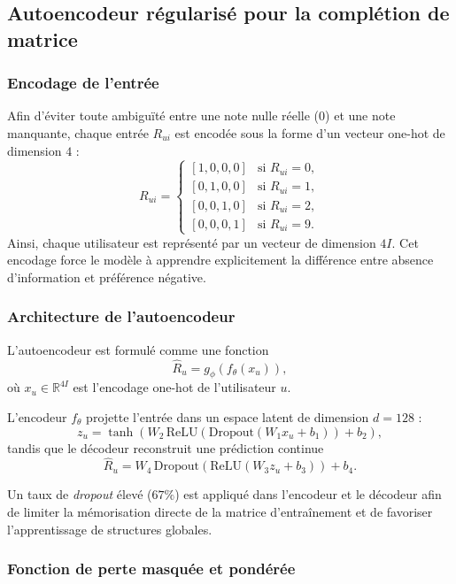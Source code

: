 \documentclass[11pt,a4paper]{article}
\begin{document}
\subsection{Autoencodeur régularisé pour la complétion de matrice}


\subsubsection{Encodage de l’entrée}

Afin d’éviter toute ambiguïté entre une note nulle réelle ($0$) et une note manquante, chaque entrée $R_{ui}$ est encodée sous la forme d’un vecteur one-hot de dimension $4$ :
\[
R_{ui} =
\begin{cases}
[1,0,0,0] & \text{si } R_{ui}=0,\\
[0,1,0,0] & \text{si } R_{ui}=1,\\
[0,0,1,0] & \text{si } R_{ui}=2,\\
[0,0,0,1] & \text{si } R_{ui}=9.
\end{cases}
\]
Ainsi, chaque utilisateur est représenté par un vecteur de dimension $4I$.  
Cet encodage force le modèle à apprendre explicitement la différence entre absence d’information et préférence négative.

\subsubsection{Architecture de l’autoencodeur}

L’autoencodeur est formulé comme une fonction
\[
\hat{R}_u = g_\phi\!\left(f_\theta(x_u)\right),
\]
où $x_u \in \mathbb{R}^{4I}$ est l’encodage one-hot de l’utilisateur $u$.

L’encodeur $f_\theta$ projette l’entrée dans un espace latent de dimension $d=128$ :
\[
z_u = \tanh\!\left(W_2 \,\mathrm{ReLU}\!\left(\mathrm{Dropout}\left(W_1 x_u + b_1\right)\right) + b_2\right),
\]
tandis que le décodeur reconstruit une prédiction continue
\[
\hat{R}_u = W_4 \,\mathrm{Dropout}\!\left(\mathrm{ReLU}\!\left(W_3 z_u + b_3\right)\right) + b_4.
\]

Un taux de \emph{dropout} élevé ($67\%$) est appliqué dans l’encodeur et le décodeur afin de limiter la mémorisation directe de la matrice d’entraînement et de favoriser l’apprentissage de structures globales.

\subsubsection{Fonction de perte masquée et pondérée}
\end{document}
